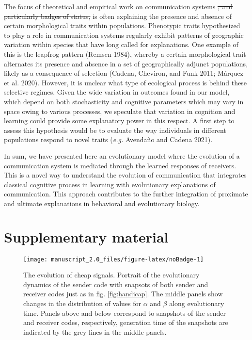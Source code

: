 \documentclass[
  12pt,
]{article}
\newcommand{\beginsupplement}{ \setcounter{table}{0}            
  \renewcommand{\thetable}{S\arabic{table}}\setcounter{figure}{0} \renewcommand{\thefigure}{S\arabic{figure}}}
\providecommand{\DIFaddtex}[1]{{\protect\color{blue}\uwave{#1}}} %
\providecommand{\DIFdeltex}[1]{{\protect\color{red}\sout{#1}}}                      %
\providecommand{\DIFaddbegin}{} %
\providecommand{\DIFaddend}{} %
\providecommand{\DIFdelbegin}{} %
\providecommand{\DIFdelend}{} %
\providecommand{\DIFaddbeginFL}{} %
\providecommand{\DIFaddendFL}{} %
\providecommand{\DIFdelbeginFL}{} %
\providecommand{\DIFdelendFL}{} %
\providecommand{\DIFadd}[1]{\texorpdfstring{\DIFaddtex{#1}}{#1}} %
\providecommand{\DIFdel}[1]{\texorpdfstring{\DIFdeltex{#1}}{}} %
\newcommand{\DIFscaledelfig}{0.5}
\newlength{\DIFdelgraphicswidth} %
\newlength{\DIFdelgraphicsheight} %
\newcommand{\DIFaddincludegraphics}[2][]{{\color{blue}\fbox{\DIFOincludegraphics[#1]{#2}}}} %
\newcommand{\DIFdelincludegraphics}[2][]{%
\sbox{\DIFdelgraphicsbox}{\DIFOincludegraphics[#1]{#2}}%
\settoboxwidth{\DIFdelgraphicswidth}{\DIFdelgraphicsbox} %
\settoboxtotalheight{\DIFdelgraphicsheight}{\DIFdelgraphicsbox} %
\scalebox{\DIFscaledelfig}{%
\parbox[b]{\DIFdelgraphicswidth}{\usebox{\DIFdelgraphicsbox}\\[-\baselineskip] \rule{\DIFdelgraphicswidth}{0em}}\llap{\resizebox{\DIFdelgraphicswidth}{\DIFdelgraphicsheight}{%
\setlength{\unitlength}{\DIFdelgraphicswidth}%
\begin{picture}(1,1)%
\thicklines\linethickness{2pt} %
{\color[rgb]{1,0,0}\put(0,0){\framebox(1,1){}}}%
{\color[rgb]{1,0,0}\put(0,0){\line( 1,1){1}}}%
{\color[rgb]{1,0,0}\put(0,1){\line(1,-1){1}}}%
\end{picture}%
}\hspace*{3pt}}} %
} %
\DeclareRobustCommand{\DIFaddbegin}{\DIFOaddbegin \let\includegraphics\DIFaddincludegraphics} %
\DeclareRobustCommand{\DIFaddend}{\DIFOaddend \let\includegraphics\DIFOincludegraphics} %
\DeclareRobustCommand{\DIFdelbegin}{\DIFOdelbegin \let\includegraphics\DIFdelincludegraphics} %
\DeclareRobustCommand{\DIFdelend}{\DIFOaddend \let\includegraphics\DIFOincludegraphics} %
\DeclareRobustCommand{\DIFaddbeginFL}{\DIFOaddbeginFL \let\includegraphics\DIFaddincludegraphics} %
\DeclareRobustCommand{\DIFaddendFL}{\DIFOaddendFL \let\includegraphics\DIFOincludegraphics} %
\DeclareRobustCommand{\DIFdelbeginFL}{\DIFOdelbeginFL \let\includegraphics\DIFdelincludegraphics} %
\DeclareRobustCommand{\DIFdelendFL}{\DIFOaddendFL \let\includegraphics\DIFOincludegraphics} %
\begin{document}
The focus of \DIFaddbegin \DIFadd{classical }\DIFaddend theoretical and empirical work on communication
systems \DIFdelbegin \DIFdel{,
and particularly badges of status, }\DIFdelend is often explaining the presence and absence of certain
morphological traits \DIFaddbegin \DIFadd{(ornaments) }\DIFaddend within populations. Phenotypic traits
hypothesized to play a role in communication systems regularly exhibit
patterns of geographic variation within species that have long called
for explanations. One example of this is the leapfrog pattern (Remsen
1984), whereby a certain morphological trait alternates its presence and
absence in a set of geographically adjunct populations, likely as a
consequence of selection (Cadena, Cheviron, and Funk 2011; Márquez et
al. 2020). However, it is unclear what type of ecological process is
behind these selective regimes. Given the wide variation in outcomes
found in our model, which depend on both stochasticity and cognitive
parameters which may vary in space owing to various processes, we
speculate that variation in cognition and learning could provide some
explanatory power in this respect. A first step to assess this
hypothesis would be to evaluate the way individuals in different
populations respond to novel traits (\emph{e.g.} Avendaño and Cadena
2021).

In sum, we have presented here an evolutionary model where the evolution
of a communication system is mediated through the learned responses of
receivers. This is a novel way to understand the evolution of
communication that integrates classical cognitive process in learning
with evolutionary explanations of communication. This approach
contributes to the further integration of proximate and ultimate
explanations in behavioral and evolutionary biology.

\hypertarget{supplementary-material}{%
\section{Supplementary material}\label{supplementary-material}}

\beginsupplement

\begin{figure}

{\centering \DIFdelbeginFL %
\DIFdelendFL \DIFaddbeginFL \texttt{[image: manuscript\_2.0\_files/figure-latex/noBadge-1]} 

\DIFaddendFL 

}

\caption{The evolution of cheap signals. Portrait of the evolutionary dynamics of the sender code with snapsots of both sender and receiver codes just as in fig. \ref{fig:handicap}. The middle panels show changes in the distribution of values for $\alpha$ and $\beta$ along evolutionary time. Panels above and below correspond to snapshots of the sender and receiver codes, respectively, generation time of the snapshots are indicated by the grey lines in the middle panels.}\label{fig:noBadge}
\end{figure}
\end{document}
